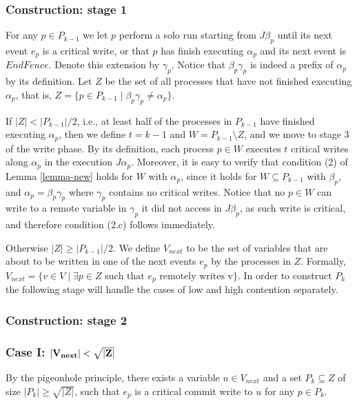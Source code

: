 \subsubsection{Construction: stage 1}
For any $p \in P_{k-1}$ we let $p$ perform a solo run starting from $J \beta_p$ until its next event $e_p$ is a critical write, or that $p$ has finish executing $\alpha_p$ and its next event is $EndFence$. Denote this extension by $\gamma_p$. Notice that $\beta_p \gamma_p$ is indeed a prefix of $\alpha_p$ by its definition.
Let $Z$ be the set of all processes that have not finished executing $\alpha_p$, that is, $Z = \{p \in P_{k-1} \mid \beta_p \gamma_p \neq \alpha_p\}$.

If $|Z|<|P_{k-1}|/2$, i.e., at least half of the processes in $P_{k-1}$ have finished executing $\alpha_p$, then we define $t=k-1$ and $W = P_{k-1} \setminus Z$, and we move to stage 3 of the write phase.
By its definition, each process $p \in W$ executes $t$ critical writes along $\alpha_p$ in the execution $J \alpha_p$. Moreover, it is easy to verify that condition (2) of Lemma \ref{lemma-new} holds for $W$ with $\alpha_p$, since it holds for $W \subseteq P_{k-1}$ with $\beta_p$, and $\alpha_p = \beta_p \gamma_p$ where $\gamma_p$ contains no critical writes. Notice that no $p \in W$ can write to a remote variable in $\gamma_p$ it did not access in $J \beta_p$, as such write is critical, and therefore condition (2.c) follows immediately.

Otherwise $|Z| \geq |P_{k-1}|/2$. We define $V_{next}$ to be the set of variables that are about to be written in one of the next events $e_p$ by the processes in $Z$. Formally, $V_{next} = \{v \in V \mid \exists p \in Z \text{ such that } e_p \text{ remotely writes v}\}$. In order to construct $P_k$ the following stage will handle the cases of low and high contention separately.


\subsubsection{Construction: stage 2}


\subsubsection*{\hspace{5mm} Case I: $\bf |V_{next}| < \sqrt{|Z|}$}

By the pigeonhole principle, there exists a variable $u \in V_{next}$ and a set $P_k \subseteq Z$ of size $|P_k| \geq \sqrt{|Z|}$, such that $e_p$ is a critical commit write to $u$ for any $p \in P_k$.


